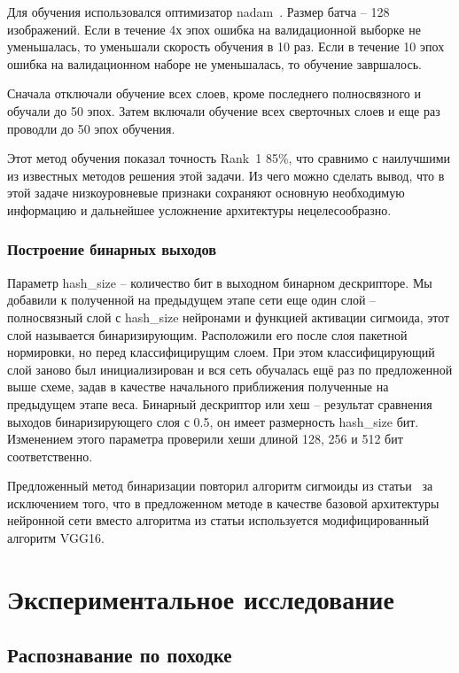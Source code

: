 \documentclass[a4paper,twoside,11pt]{article}
\numberwithin{equation}{section}
\begin{document}
Для обучения использовался оптимизатор nadam~\cite{dozat2016incorporating}. Размер батча -- 128 изображений. Если в течение 4х эпох ошибка на валидационной выборке не уменьшалась, то уменьшали скорость обучения в 10 раз. Если в течение 10 эпох ошибка на валидационном наборе не уменьшалась, то обучение завршалось.

Сначала отключали обучение всех слоев, кроме последнего полносвязного и обучали до 50 эпох. Затем включали обучение всех сверточных слоев и еще раз проводли до 50 эпох обучения.

Этот метод обучения показал точность Rank~1 85\%, что сравнимо с наилучшими из известных методов решения этой задачи. Из чего можно сделать вывод, что в этой задаче низкоуровневые признаки сохраняют основную необходимую информацию и дальнейшее усложнение архитектуры нецелесообразно.

\subsubsection{Построение бинарных выходов}

Параметр hash\_size -- количество бит в выходном бинарном дескрипторе. Мы добавили к полученной на предыдущем этапе сети еще один слой -- полносвязный слой с hash\_size нейронами и функцией активации сигмоида, этот слой называется бинаризирующим. Расположили его после слоя пакетной нормировки, но перед классифицирущим слоем. При этом классифицирующий слой заново был инициализирован и вся сеть обучалась ещё раз по предложенной выше схеме, задав в качестве начального приближения полученные на предыдущем этапе веса. Бинарный дескриптор или хеш -- результат сравнения выходов бинаризирующего слоя с 0.5, он имеет размерность hash\_size бит. Изменением этого параметра проверили хеши длиной 128, 256 и 512 бит соответственно.

Предложенный метод бинаризации повторил алгоритм сигмоиды из статьи~\cite{lin2015deep} за исключением того, что в предложенном методе в качестве базовой архитектуры нейронной сети вместо алгоритма из статьи используется модифицированный алгоритм VGG16.

\section{Экспериментальное исследование}

\subsection{Распознавание по походке}
\end{document}
